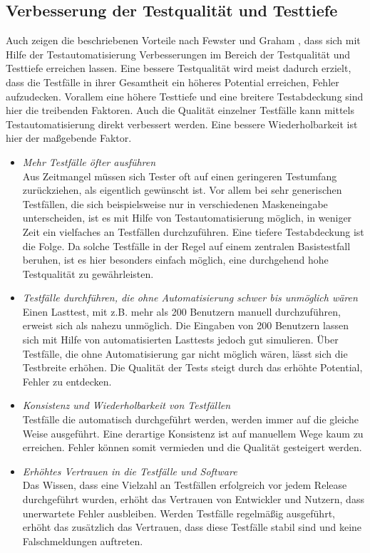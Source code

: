 \subsection{Verbesserung der Testqualität und Testtiefe}
\label{sec:verbesserung_der_testqualität_und_testtiefe}
Auch zeigen die beschriebenen Vorteile nach Fewster und Graham \cite[vgl. S. 9 ff.]{fewster_software_1999}, dass sich mit Hilfe der Testautomatisierung Verbesserungen im Bereich der Testqualität und Testtiefe erreichen lassen. Eine bessere Testqualität wird meist dadurch erzielt, dass die Testfälle in ihrer Gesamtheit ein höheres Potential erreichen, Fehler aufzudecken. Vorallem eine höhere Testtiefe und eine breitere Testabdeckung sind hier die treibenden Faktoren. Auch die Qualität einzelner Testfälle kann mittels Testautomatisierung direkt verbessert werden. Eine bessere Wiederholbarkeit ist hier der maßgebende Faktor.


\begin{itemize}
\item \textit{Mehr Testfälle öfter ausführen} \\
Aus Zeitmangel müssen sich Tester oft auf einen geringeren Testumfang zurückziehen, als eigentlich gewünscht ist. Vor allem bei sehr generischen Testfällen, die sich beispielsweise nur in verschiedenen Maskeneingabe unterscheiden, ist es mit Hilfe von Testautomatisierung möglich, in weniger Zeit ein vielfaches an Testfällen durchzuführen.
Eine tiefere Testabdeckung ist die Folge. Da solche Testfälle in der Regel auf einem zentralen Basistestfall beruhen, ist es hier besonders einfach möglich, eine durchgehend hohe Testqualität zu gewährleisten.
\item \textit{Testfälle durchführen, die ohne Automatisierung schwer bis unmöglich wären} \\
Einen Lasttest, mit z.B. mehr als 200 Benutzern manuell durchzuführen, erweist sich als nahezu unmöglich. Die Eingaben von 200 Benutzern lassen sich mit Hilfe von automatisierten Lasttests jedoch gut simulieren. Über Testfälle, die ohne Automatisierung gar nicht möglich wären, lässt sich die Testbreite erhöhen. Die Qualität der Tests steigt durch das erhöhte Potential, Fehler zu entdecken.
\item \textit{Konsistenz und Wiederholbarkeit von Testfällen} \\
Testfälle die automatisch durchgeführt werden, werden immer auf die gleiche Weise ausgeführt. Eine derartige Konsistenz ist auf manuellem Wege kaum zu erreichen. Fehler können somit vermieden und die Qualität gesteigert werden. 
\item \textit{Erhöhtes Vertrauen in die Testfälle und Software } \\
Das Wissen, dass eine Vielzahl an Testfällen erfolgreich vor jedem Release durchgeführt wurden, erhöht das Vertrauen von Entwickler und Nutzern, dass unerwartete Fehler ausbleiben.
Werden Testfälle regelmäßig ausgeführt, erhöht das zusätzlich das Vertrauen, dass diese Testfälle stabil sind und keine Falschmeldungen auftreten.
\end{itemize}


